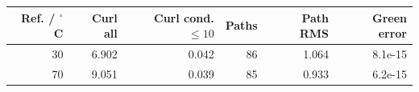 \begin{tabular}{rrrrrr}
\toprule
Ref. / $^\circ$C & Curl all & Curl cond.$\le10$ & Paths & Path RMS & Green error\\
\midrule
30 & 6.902 & 0.042 & 86 & 1.064 & 8.1e-15 \\
70 & 9.051 & 0.039 & 85 & 0.933 & 6.2e-15 \\
\bottomrule
\end{tabular}
